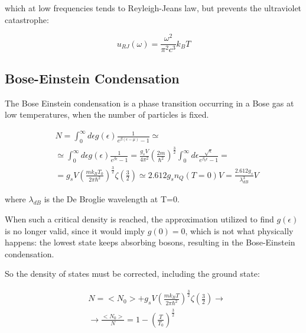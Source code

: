 \documentclass{article}
\begin{document}
which at low frequencies tends to Reyleigh-Jeans law, but prevents the ultraviolet catastrophe:

\begin{equation}
    u_{RJ}(\omega)=\frac{ \omega^2}{\pi^2c^3}k_BT
\end{equation}


\subsection{Bose-Einstein Condensation}

The Bose Einstein condensation is a phase transition occurring in a Bose gas at low temperatures,
when the number of particles is fixed.

\begin{equation}
    \begin{aligned}
         & N=\int_0^\infty d\epsilon g(\epsilon)\frac{1}{e^{\beta(\epsilon-\mu)}-1}\simeq                                                                                                                                  \\
         & \simeq \int_0^\infty d\epsilon g(\epsilon)\frac{1}{e^{\beta \epsilon}-1}=\frac{g_sV}{4\pi^2}\left(\frac{2m}{\hbar^2}\right)^{\frac{3}{2}}\int_0^\infty d\epsilon \frac{\sqrt{\epsilon}}{e^{\beta_0\epsilon}-1}= \\
         & =g_sV\left(\frac{mk_BT_0}{2\pi\hbar^2}\right)^{\frac{3}{2}}\zeta\left(\frac{3}{2}\right)\simeq 2.612 g_s n_Q(T=0) V= \frac{2.612 g_s}{\lambda_{dB}^3}V
    \end{aligned}
\end{equation}

where $\lambda_{dB}$ is the De Broglie wavelength at T=0.

When such a critical density is reached, the approximation utilized to find $g(\epsilon)$ is no
longer valid, since it would imply $g(0)=0$, which is not what physically happens: the lowest state keeps
absorbing bosons, resulting in the Bose-Einstein condensation.

So the density of states must be corrected, including the ground state:

\begin{equation}
    \begin{aligned}
         & N=<N_0>+g_s V \left(\frac{mk_BT}{2\pi \hbar^2}\right)^{\frac{3}{2}}\zeta\left(\frac{3}{2}\right) \rightarrow \\
         & \rightarrow \frac{<N_0>}{N}=1-\left(\frac{T}{T_0}\right)^{\frac{3}{2}}
    \end{aligned}
\end{equation}
\end{document}
